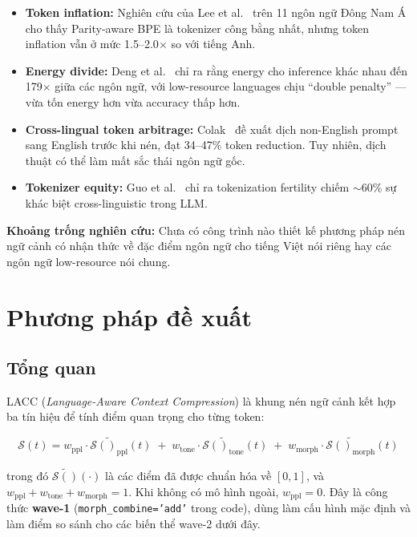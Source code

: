 \documentclass[12pt,a4paper]{article}
\newcommand{\score}[1]{\mathcal{S}(#1)}      %
\newcommand{\method}[1]{\textsc{#1}}         %
\begin{document}
\begin{itemize}
    \item \textbf{Token inflation:} Nghiên cứu của Lee et al.~\cite{lee2026equity} trên 11 ngôn ngữ Đông Nam Á cho thấy Parity-aware BPE là tokenizer công bằng nhất, nhưng token inflation vẫn ở mức 1.5--2.0$\times$ so với tiếng Anh.
    \item \textbf{Energy divide:} Deng et al.~\cite{deng2026language} chỉ ra rằng energy cho inference khác nhau đến 179$\times$ giữa các ngôn ngữ, với low-resource languages chịu ``double penalty'' --- vừa tốn energy hơn vừa accuracy thấp hơn.
    \item \textbf{Cross-lingual token arbitrage:} Colak~\cite{colak2026cross} đề xuất dịch non-English prompt sang English trước khi nén, đạt 34--47\% token reduction. Tuy nhiên, dịch thuật có thể làm mất sắc thái ngôn ngữ gốc.
    \item \textbf{Tokenizer equity:} Guo et al.~\cite{guo2026brain} chỉ ra tokenization fertility chiếm $\sim$60\% sự khác biệt cross-linguistic trong LLM.
\end{itemize}

\textbf{Khoảng trống nghiên cứu:} Chưa có công trình nào thiết kế phương pháp nén ngữ cảnh có nhận thức về đặc điểm ngôn ngữ cho tiếng Việt nói riêng hay các ngôn ngữ low-resource nói chung.


\section{Phương pháp đề xuất}

\subsection{Tổng quan}

\method{LACC} (\textit{Language-Aware Context Compression}) là khung nén ngữ cảnh kết hợp ba tín hiệu để tính điểm quan trọng cho từng token:

\begin{equation}\label{eq:combined}
    \score{t} = w_{\text{ppl}} \cdot \tilde{\score{}_{\text{ppl}}}(t) \;+\; w_{\text{tone}} \cdot \tilde{\score{}_{\text{tone}}}(t) \;+\; w_{\text{morph}} \cdot \tilde{\score{}_{\text{morph}}}(t)
\end{equation}

trong đó $\tilde{\score{}}(\cdot)$ là các điểm đã được chuẩn hóa về $[0, 1]$, và $w_{\text{ppl}} + w_{\text{tone}} + w_{\text{morph}} = 1$. Khi không có mô hình ngoài, $w_{\text{ppl}} = 0$. Đây là công thức \textbf{wave-1} (\texttt{morph\_combine='add'} trong code), dùng làm cấu hình mặc định và làm điểm so sánh cho các biến thể wave-2 dưới đây.
\end{document}
